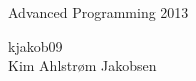 \begin{center}
\huge{Advanced Programming 2013}



\large{kjakob09} \\

\large{Kim Ahlstrøm Jakobsen}
\end{center}